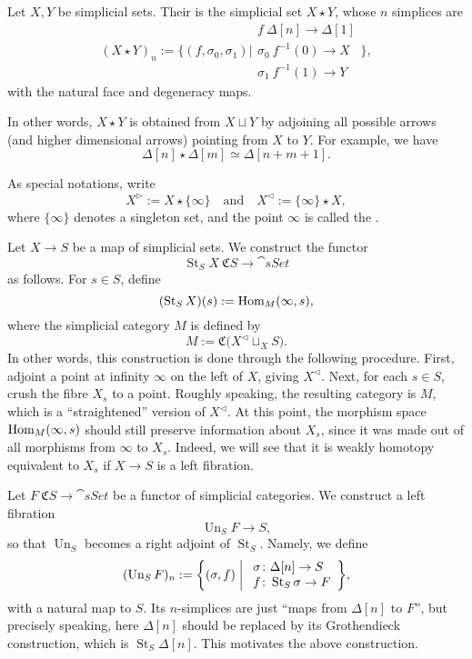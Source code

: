 \begin{definition}
    Let $X,Y$ be simplicial sets. Their 
    is the simplicial set $X\star Y$, whose $n$ simplices are 
    \[(X\star Y)_n:=\Biggl\{(f,\sigma_0,\sigma_1)\mathrel{\Bigg|}
    \begin{array}{l}
        f\:\Delta[n]\to\Delta[1]\\
        \sigma_0\:f^{-1}(0)\to X\\
        \sigma_1\:f^{-1}(1)\to Y
    \end{array}\Biggr\},\]
    with the natural face and degeneracy maps.
\end{definition}

In other words, $X\star Y$ is obtained from $X\sqcup Y$
by adjoining all possible arrows (and higher dimensional arrows)
pointing from $X$ to $Y$. For example, we have
\[ \Delta[n]\star\Delta[m]\simeq\Delta[n+m+1]. \]

As special notations, write
\[X^\vartriangleright:=X\star\{\infty\}\quad\text{and}\quad X^\vartriangleleft:=\{\infty\}\star X,\]
where $\{\infty\}$ denotes a singleton set,
and the point $\infty$ is called the .

\begin{construction}
    Let $X\to S$ be a map of simplicial sets.
    We construct the functor 
    \[\operatorname{St}_SX\:\mathfrak CS\to\cat{sSet}\]
    as follows. For $s\in S$, define 
    \[(\operatorname{St}_SX)(s):=\operatorname{Hom}_M(\infty,s),\]
    where the simplicial category $M$ is defined by 
    \[M:=\mathfrak C\bigl(X^\vartriangleleft\mathop{\sqcup}_XS\bigr).\]
    In other words, this construction is done through the following procedure.
    First, adjoint a point at infinity $\infty$ on the left of $X$, giving $X^\vartriangleleft$.
    Next, for each $s\in S$, crush the fibre $X_s$ to a point.
    Roughly speaking, the resulting category is $M$,
    which is a ``straightened'' version of $X^\vartriangleleft$.
    At this point, the morphism space $\operatorname{Hom}_M(\infty,s)$
    should still preserve information about $X_s$,
    since it was made out of all morphisms from $\infty$ to $X_s$.
    Indeed, we will see that it is weakly homotopy equivalent to $X_s$
    if $X\to S$ is a left fibration.
    \varqed
\end{construction}

\begin{construction}
    Let $F\:\mathfrak CS\to\cat{sSet}$ be a functor of simplicial categories.
    We construct a left fibration 
    \[\operatorname{Un}_SF\to S,\]
    so that $\operatorname{Un}_S$ becomes a right adjoint of $\operatorname{St}_S$.
    Namely, we define 
    \[ (\operatorname{Un}_SF)_n:=\biggl\{(\sigma,f)\mathrel{\bigg|}\begin{array}{l}
        \sigma\colon\Delta[n]\to S\\
        f\colon\operatorname{St}_S\sigma\to F
    \end{array}\biggr\}, \]
    with a natural map to $S$.
    Its $n$-simplices are just ``maps from $\Delta[n]$ to $F$'',
    but precisely speaking, here $\Delta[n]$ should be replaced by its 
    Grothendieck construction,
    which is $\operatorname{St}_S\Delta[n]$.
    This motivates the above construction. \varqed
\end{construction}

